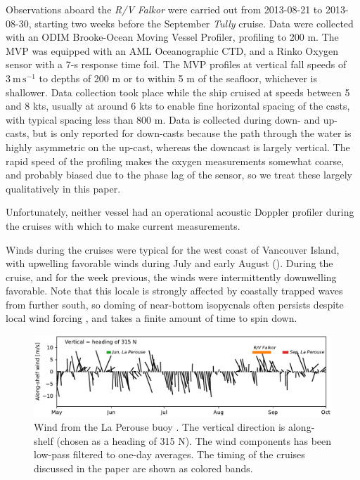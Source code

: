 \documentclass[draft]{agujournal2019}
\begin{document}
Observations aboard the \emph{R/V Falkor} were carried out from 2013-08-21 to 2013-08-30, starting two weeks before the September \emph{Tully} cruise.  Data were collected with an ODIM Brooke-Ocean Moving Vessel Profiler, profiling to 200 m.  The MVP was equipped with an AML Oceanographic CTD, and a Rinko Oxygen sensor with a 7-s response time foil.  The MVP profiles at vertical fall speeds of $3\ \mathrm{m\,s^{-1}}$ to depths of 200 m or to within 5 m of the seafloor, whichever is shallower.  Data collection took place while the ship cruised at speeds between 5 and 8 kts, usually at around 6 kts to enable fine horizontal spacing of the casts, with typical spacing less than 800 m.  Data is collected during down- and up-casts, but is only reported for down-casts because the path through the water is highly asymmetric on the up-cast, whereas the downcast is largely vertical.  The rapid speed of the profiling makes the oxygen measurements somewhat coarse, and probably biased due to the phase lag of the sensor, so we treat these largely qualitatively in this paper.

Unfortunately, neither vessel had an operational acoustic Doppler profiler during the cruises with which to make current measurements.

Winds during the cruises were typical for the west coast of Vancouver Island, with upwelling favorable winds during July and early August ().  During the cruise, and for the week previous, the winds were intermittently downwelling favorable.  Note that this locale is strongly affected by coastally trapped waves from further south, so doming of near-bottom isopycnals often persists despite local wind forcing \cite{thomsonkrassovski15, engidaetal16}, and takes a finite amount of time to spin down.

\begin{figure}[htbp]
  \begin{center}
    \includegraphics[width=5.5in]{LaPeWind}
    \caption{
      Wind from the La Perouse buoy \cite{DFOWind2013C46206}.  The vertical direction is along-shelf (chosen as a heading of 315 N).  The wind components has been low-pass filtered to one-day averages.  The timing of the cruises discussed in the paper are shown as colored bands.
      \label{fig:LaPeWind} }
  \end{center}
\end{figure}
\end{document}
